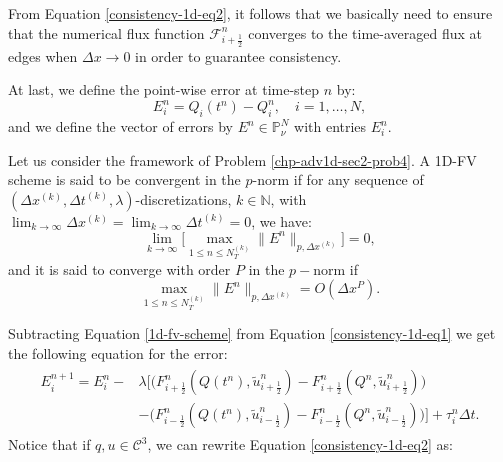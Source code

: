 From Equation \eqref{consistency-1d-eq2}, it follows that we basically need to ensure that 
the numerical flux function $\mathcal{F}^n_{i+\frac{1}{2}}$ converges to the time-averaged flux at edges
when $\Delta x \to 0$ in order to guarantee consistency.

At last, we define the point-wise error at time-step $n$ by:
\begin{equation*}
	E_i^n = Q_i(t^n) - Q_i^n, \quad i=1, \ldots, N,
\end{equation*}
and we define the vector of errors by $E^n \in \mathbb{P}^{N}_{\nu}$ with entries $E_i^n$.
\begin{definition}[Convergence]
	\label{chp-adv1d-def-conv}
	Let us consider the framework of Problem \ref{chp-adv1d-sec2-prob4}.
	A 1D-FV scheme is said to be convergent in the $p$-norm if for any sequence of $(\Delta x^{(k)}, \Delta t^{(k)},\lambda)$-discretizations, 
	$k \in \mathbb{N}$, with $\lim_{k\to \infty }{\Delta x^{(k)}} = \lim_{k\to \infty }{\Delta t^{(k)}} = 0$, we have:
	\begin{equation*}
		\lim_{k\to \infty}\bigg[ {\max_{1\leq n\leq N_T^{(k)}}}{\|E^n\|_{p,\Delta x^{(k)}}} \bigg] = 0,
	\end{equation*}
	and it is said to converge with order $P$ in the $p-$norm if
	\begin{equation*}
		{\max_{1\leq n\leq N_T^{(k)}}}{\|E^n\|_{p,\Delta x^{(k)}}} = O(\Delta x^P).
	\end{equation*}
\end{definition}
Subtracting Equation \eqref{1d-fv-scheme} from Equation \eqref{consistency-1d-eq1} we get
the following equation for the error:
\begin{align}
	\begin{split}
		\label{erroreq-1d-eq2}
		E^{n+1}_i = E^n_i -
		&\lambda
		\bigg[
		\bigg( {F}^n_{i+\frac{1}{2}}(Q(t^n),\tilde{u}^n_{i+\frac{1}{2}}) - {F}^n_{i+\frac{1}{2}}(Q^n,\tilde{u}^n_{i+\frac{1}{2}}) \bigg) \\
		&-\bigg( {F}^n_{i-\frac{1}{2}}(Q(t^n),\tilde{u}^n_{i-\frac{1}{2}}) - {F}^n_{i-\frac{1}{2}}(Q^n,\tilde{u}^n_{i-\frac{1}{2}}) \bigg)
		\bigg] 
		+ \tau_{i}^n \Delta t .
	\end{split}
\end{align}
Notice that if $q,u \in \mathcal{C}^3$, we can rewrite Equation \eqref{consistency-1d-eq2} as:
